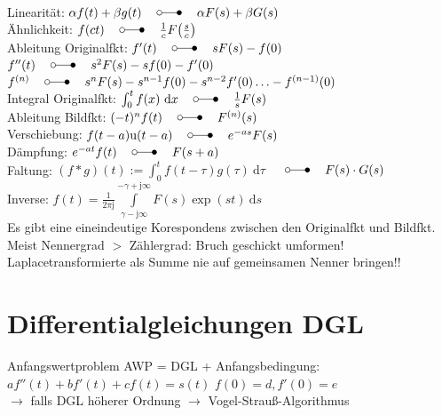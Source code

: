 \documentclass[6pt,a4paper]{scrartcl}
\let\oldlaplace = \laplace
\renewcommand{\i}{\ensuremath{\mathrm{j}}}										%
\newcommand{\Ra}[0]{\ensuremath{\Rightarrow}}									%
\newcommand{\ra}[0]{\ensuremath{\rightarrow}} 									%
\newcommand{\diff}{\ensuremath{\ \mathrm d}}									%
\newcommand{\heavi}{\ensuremath{\mathrm{u}}}									%
\renewcommand{\laplace}{\ \; \oldlaplace \ \;}
\begin{document}
\begin{multicols}{4}
\begin{tabular}{rl|rl}
	\end{tabular}\\
	\everymath{\textstyle}
	Linearität: $\alpha f(t) + \beta g(t) \laplace \alpha F(s) + \beta G(s)$\\
	Ähnlichkeit: $f(ct) \laplace \frac{1}{c} F\bigl(  \frac{s}{c} \bigr)$\\
	Ableitung Originalfkt: $f'(t) \laplace s F(s) - f(0)$ \quad $f''(t) \laplace s^2 F(s) - sf(0) - f'(0)$\\
	$f^{(n)} \laplace s^n F(s) - s^{n-1} f(0) - s^{n-2} f'(0) \ldots - f^{(n-1)}(0)$\\
	Integral Originalfkt: $\int_0^t f(x) \diff x \laplace \frac{1}{s} F(s)$\\
	Ableitung Bildfkt: $(-t)^n f(t) \laplace F^{(n)} (s)$\\
	Verschiebung: $f(t-a)\heavi(t-a) \laplace e^{-as} F(s)$\\
	Dämpfung: $e^{-at} f(t) \laplace F(s+a)$\\
	Faltung: $(f * g)(t) := \int_0^t f( t - \tau) g(\tau) \diff \tau$ $\laplace F(s) \cdot G(s)$\\
	Inverse: $f(t) = \frac{1}{2\pi \i} \int\limits_{\gamma - \i \infty}^{-\gamma + \i \infty} F(s) \exp(st) \diff s$\\
	Es gibt eine eineindeutige Korespondens zwischen den Originalfkt und Bildfkt.
	Meist Nennergrad $>$ Zählergrad: Bruch geschickt umformen!
	Laplacetransformierte als Summe nie auf gemeinsamen Nenner bringen!!




\section{Differentialgleichungen DGL}



Anfangswertproblem AWP = DGL + Anfangsbedingung:\\
$a f''(t) + b f'(t) + c f(t) = s(t)$ \quad $f(0) = d, f'(0) = e$ \\
$\ra$ falls DGL höherer Ordnung $\ra$ Vogel-Strauß-Algorithmus


\end{multicols}
\end{document}

